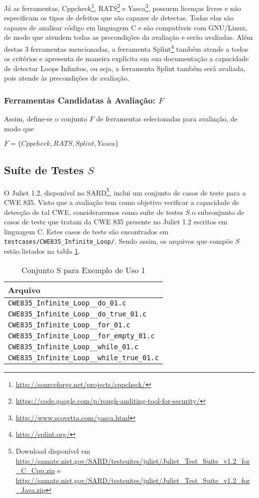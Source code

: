 Já as ferramentas, Cppcheck\footnote{\url{http://sourceforge.net/projects/cppcheck/}}, RATS\footnote{\url{https://code.google.com/p/rough-auditing-tool-for-security/}} e Yasca\footnote{\url{http://www.scovetta.com/yasca.html}}, possuem licenças livres e não especificam os tipos de defeitos que são capazes de detectas. Todas elas são capazes de analisar código em linguagem C e são compatíveis com GNU/Linux, de modo que atendem todas as precondições da avaliação e serão avaliadas. Além destas 3 ferramentas mencionadas, a ferramenta Splint\footnote{\url{http://splint.org/}} também atende a todos os critérios e apresenta de maneira explícita em sua documentação a capacidade de detectar Loops Infinitos, ou seja, a ferramenta Splint também será avaliada, pois atende às precondições de avaliação.

\subsubsection{Ferramentas Candidatas à Avaliação: $F$}

Assim, define-se o conjunto $F$ de ferramentas selecionadas para avaliação, de modo que

$F = \lbrace Cppcheck, RATS, Splint, Yasca\rbrace$

\subsection{Suíte de Testes $S$}

O Juliet 1.2, disponível no SARD\footnote{Download disponível em \url{http://samate.nist.gov/SARD/testsuites/juliet/Juliet_Test_Suite_v1.2_for_C_Cpp.zip} e \url{http://samate.nist.gov/SARD/testsuites/juliet/Juliet_Test_Suite_v1.2_for_Java.zip}}, inclui um conjunto de casos de teste para a CWE 835. Visto que a avaliação tem como objetivo verificar a capacidade de detecção de tal CWE, consideraremos como suíte de testes $S$ o subconjunto de casos de teste que tratam da CWE 835 presente no Juliet 1.2 escritos em linguagem C. Estes casos de teste são encontrados em \lstinline{testcases/CWE835_Infinite_Loop/}. Sendo assim, os arquivos que compõe $S$ estão listados na tabla \ref{tabela_S_eu1}.

\begin{table}
  \centering
\begin{tabular}{| l |}
  \hline
  \textbf{Arquivo} \\ \hline
  \lstinline!CWE835_Infinite_Loop__do_01.c! \\ \hline
  \lstinline!CWE835_Infinite_Loop__do_true_01.c! \\ \hline
  \lstinline!CWE835_Infinite_Loop__for_01.c! \\ \hline
  \lstinline!CWE835_Infinite_Loop__for_empty_01.c! \\ \hline
  \lstinline!CWE835_Infinite_Loop__while_01.c! \\ \hline
  \lstinline!CWE835_Infinite_Loop__while_true_01.c! \\ \hline
\end{tabular}
\caption{Conjunto S para Exemplo de Uso 1}
\label{tabela_S_eu1}
\end{table}

